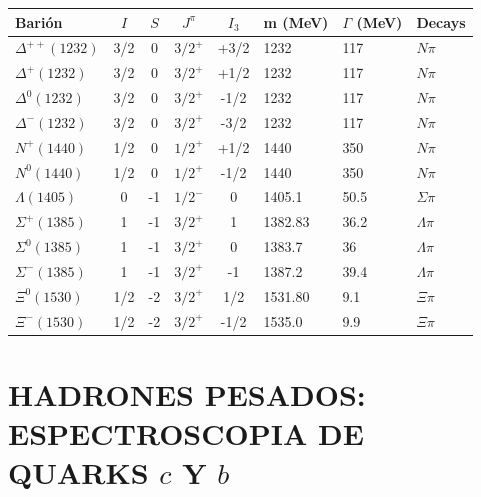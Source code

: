 {
\centering
\begin{tabular}{|l|c|c|c|c|l|l|l|}
\hline
\textbf{Barión} & $I$ & $S$ & $J^\pi$ & $I_3$ & \textbf{m (MeV)} & $\Gamma$ \textbf{(MeV)} & \textbf{Decays} \\ \hline
$\Delta^{++}(1232)$ & 3/2 & 0 & $3/2^+$ & +3/2 & 1232 & 117 & $N\pi$ \\ \hline
$\Delta^+(1232)$ & 3/2 & 0 & $3/2^+$ & +1/2 & 1232 & 117 & $N\pi$ \\ \hline
$\Delta^0(1232)$ & 3/2 & 0 & $3/2^+$ & -1/2 & 1232 & 117 & $N\pi$ \\ \hline
$\Delta^-(1232)$ & 3/2 & 0 & $3/2^+$ & -3/2 & 1232 & 117 & $N\pi$ \\ \hline
$N^+(1440)$ & 1/2 & 0 & $1/2^+$ & +1/2 & 1440 & 350 & $N\pi$ \\ \hline
$N^0(1440)$ & 1/2 & 0 & $1/2^+$ & -1/2 & 1440 & 350 & $N\pi$ \\ \hline
$\Lambda(1405)$ & 0 & -1 & $1/2^-$ & 0 & 1405.1 & 50.5 & $\Sigma\pi$ \\ \hline
$\Sigma^+(1385)$ & 1 & -1 & $3/2^+$ & 1 & 1382.83 & 36.2 & $\Lambda\pi$ \\ \hline
$\Sigma^0(1385)$ & 1 & -1 & $3/2^+$ & 0 & 1383.7 & 36 & $\Lambda\pi$ \\ \hline
$\Sigma^-(1385)$ & 1 & -1 & $3/2^+$ & -1 & 1387.2 & 39.4 & $\Lambda\pi$ \\ \hline
$\Xi^0(1530)$ & 1/2 & -2 & $3/2^+$ & 1/2 & 1531.80 & 9.1 & $\Xi\pi$ \\ \hline
$\Xi^-(1530)$ & 1/2 & -2 & $3/2^+$ & -1/2 & 1535.0 & 9.9 & $\Xi\pi$ \\ \hline
\end{tabular}

}


\section{HADRONES PESADOS: ESPECTROSCOPIA DE QUARKS $c$ Y $b$}
\vspace{0.1cm}


